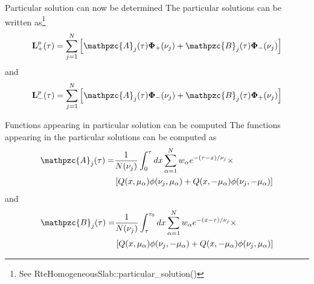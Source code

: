 \documentclass{beamer}
\newcommand{\mvec}[1]{\mathbf{#1}}
\newcommand{\gvec}[1]{\boldsymbol{#1}}
\newcommand{\script}[1]{\mathpzc{#1}}
\begin{document}
\begin{frame}{Particular solution can now be determined}
  The particular solutions can be written as\footnote{See
    RteHomogeneousSlab::particular\_solution()}
  \begin{align}
    \mvec{L}^p_+(\tau) = \sum_{j=1}^N
    \left[
      \script{A}_j(\tau) \gvec{\Phi}_+(\nu_j) +
      \script{B}_j(\tau) \gvec{\Phi}_-(\nu_j)
    \right]
  \end{align}
  and
  \begin{align}
    \mvec{L}^p_-(\tau) = \sum_{j=1}^N
    \left[
      \script{A}_j(\tau) \gvec{\Phi}_-(\nu_j) +
      \script{B}_j(\tau) \gvec{\Phi}_+(\nu_j)
    \right]
  \end{align}
\end{frame}

\begin{frame}{Functions appearing in particular solution can be
    computed}
  The functions appearing in the particular solutions can be computed
  as
  \begin{align}
    \script{A}_j(\tau) = &\frac{1}{N(\nu_j)}
    \int_0^\tau dx
    \sum_{\alpha=1}^N w_\alpha e^{-(\tau-x)/\nu_j} \times \notag \\
    & \left[
      Q(x,\mu_\alpha)\phi(\nu_j,\mu_\alpha) +
      Q(x,-\mu_\alpha)\phi(\nu_j,-\mu_\alpha)
      \right]
  \end{align}
  and
  \begin{align}
    \script{B}_j(\tau) = &\frac{1}{N(\nu_j)}
    \int_\tau^{\tau_0} dx
    \sum_{\alpha=1}^N w_\alpha e^{-(x-\tau)/\nu_j} \times \notag \\
    &\left[
      Q(x,\mu_\alpha)\phi(\nu_j,-\mu_\alpha) +
      Q(x,-\mu_\alpha)\phi(\nu_j,\mu_\alpha)
      \right]
  \end{align}
\end{frame}
\end{document}
